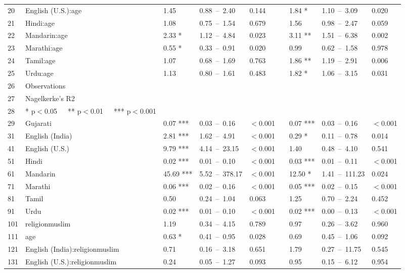 \begin{table}[ht]
\begin{tabular}{}
  20 & English (U.S.):age & 1.45 & 0.88 – 2.40 & 0.144 &  & 1.84 * & 1.10 – 3.09 & 0.020 \\ 
  21 & Hindi:age & 1.08 & 0.75 – 1.54 & 0.679 &  & 1.56 & 0.98 – 2.47 & 0.059 \\ 
  22 & Mandarin:age & 2.33 * & 1.12 – 4.84 & 0.023 &  & 3.11 ** & 1.51 – 6.38 & 0.002 \\ 
  23 & Marathi:age & 0.55 * & 0.33 – 0.91 & 0.020 &  & 0.99 & 0.62 – 1.58 & 0.978 \\ 
  24 & Tamil:age & 1.07 & 0.68 – 1.69 & 0.763 &  & 1.86 ** & 1.19 – 2.91 & 0.006 \\ 
  25 & Urdu:age & 1.13 & 0.80 – 1.61 & 0.483 &  & 1.82 * & 1.06 – 3.15 & 0.031 \\ 
  26 & Observations &  &  &  &  &  &  &  \\ 
  27 & Nagelkerke's R2 &  &  &  &  &  &  &  \\ 
  28 & * p$<$0.05   ** p$<$0.01   *** p$<$0.001 &  &  &  &  &  &  &  \\ 
  29 & Gujarati & 0.07 *** & 0.03 – 0.16 & $<$0.001 &  & 0.07 *** & 0.03 – 0.16 & $<$0.001 \\ 
  31 & English (India) & 2.81 *** & 1.62 – 4.91 & $<$0.001 &  & 0.29 * & 0.11 – 0.78 & 0.014 \\ 
  41 & English (U.S.) & 9.79 *** & 4.14 – 23.15 & $<$0.001 &  & 1.40 & 0.48 – 4.10 & 0.541 \\ 
  51 & Hindi & 0.02 *** & 0.01 – 0.10 & $<$0.001 &  & 0.03 *** & 0.01 – 0.11 & $<$0.001 \\ 
  61 & Mandarin & 45.69 *** & 5.52 – 378.17 & $<$0.001 &  & 12.50 * & 1.41 – 111.23 & 0.024 \\ 
  71 & Marathi & 0.06 *** & 0.02 – 0.16 & $<$0.001 &  & 0.05 *** & 0.02 – 0.15 & $<$0.001 \\ 
  81 & Tamil & 0.50 & 0.24 – 1.04 & 0.063 &  & 1.25 & 0.70 – 2.24 & 0.452 \\ 
  91 & Urdu & 0.02 *** & 0.01 – 0.10 & $<$0.001 &  & 0.02 *** & 0.00 – 0.13 & $<$0.001 \\ 
  101 & religionmuslim & 1.19 & 0.34 – 4.15 & 0.789 &  & 0.97 & 0.26 – 3.62 & 0.960 \\ 
  111 & age & 0.63 * & 0.41 – 0.95 & 0.028 &  & 0.69 & 0.45 – 1.06 & 0.092 \\ 
  121 & English (India):religionmuslim & 0.71 & 0.16 – 3.18 & 0.651 &  & 1.79 & 0.27 – 11.75 & 0.545 \\ 
  131 & English (U.S.):religionmuslim & 0.24 & 0.05 – 1.27 & 0.093 &  & 0.95 & 0.15 – 6.12 & 0.954 \\ 

\end{tabular}
\end{table}
